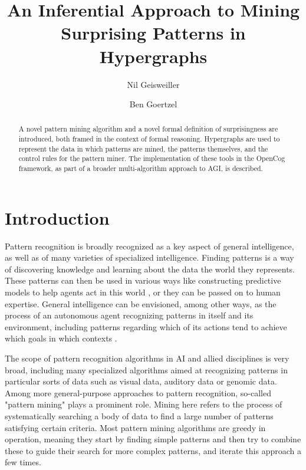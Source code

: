 \documentclass[runningheads]{llncs}
\begin{document}
%
\title{An Inferential Approach to Mining Surprising Patterns in Hypergraphs}
%
%
\author{Nil Geisweiller
  \and Ben Goertzel}
%
%
%
\maketitle              %
%

\begin{abstract}
  A novel pattern mining algorithm and a novel formal
  definition of surprisingness are introduced, both framed in
  the context of formal reasoning.   Hypergraphs are used 
  to represent the data in which patterns are mined, the patterns
  themselves, and the control rules for the pattern miner.
   The implementation of these
  tools in the OpenCog framework, as part of a broader
  multi-algorithm approach to AGI, is described.

\end{abstract}

\section{Introduction}

Pattern recognition is broadly recognized as a key aspect
of general intelligence, as well as of many varieties of
specialized intelligence.   Finding patterns is a way of discovering knowledge and learning about
the data the world they represents. These patterns can then be used
in various ways like constructing predictive models to help agents act in
this world \cite{Jade12Pat}, or they can be passed on to human
expertise.  General intelligence can be envisioned, among other ways, as the process
of an autonomous agent recognizing patterns in itself and its environment,
including patterns regarding which of its actions tend to achieve which goals in
which contexts \cite{Goertzel2014EGI1}.

The scope of pattern recognition algorithms in AI and allied disciplines
is very broad, including many specialized algorithms aimed at recognizing
patterns in particular sorts of data such as visual data, auditory data or
genomic data.   Among more general-purpose approaches to pattern recognition,
so-called "pattern mining" plays a prominent role.   Mining here refers to the process
of systematically searching a body of data to find a large number of patterns
satisfying certain criteria.   Most pattern mining algorithms are greedy in operation,
meaning they start by finding simple patterns and then try to combine these to guide
their search for more complex patterns, and iterate this approach a few times.
\end{document}
